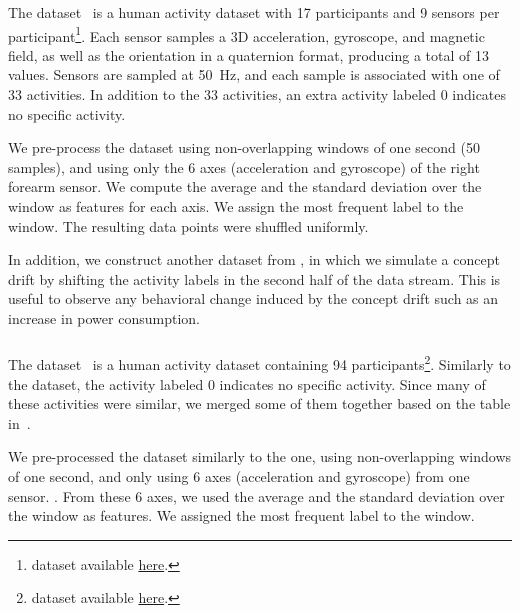\subsubsection{\banosdataset}
The \banosdataset dataset~\cite{Banos_2014} is a
human activity dataset with 17 participants
and 9 sensors per
participant\footnote{\banosdataset dataset
available
\href{https://archive.ics.uci.edu/ml/datasets/REALDISP+Activity+Recognition+Dataset\#:\~:text=The\%20REALDISP\%20(REAListic\%20sensor\%20DISPlacement,\%2Dplacement\%20and\%20induced\%2Ddisplacement.}{here}.}. Each sensor samples a 3D
acceleration, gyroscope, and magnetic field, as
well as the orientation in a quaternion format,
producing a total of 13 values.  Sensors are
sampled at 50~Hz, and each sample is associated
with one of 33 activities. In addition to the 33
activities, an extra activity labeled 0 indicates
no specific activity.

We pre-process the \banosdataset dataset using
non-overlapping windows of one second (50
samples), and using only the 6 axes (acceleration
and gyroscope)
of the right forearm sensor. We compute the average and the standard deviation over the
window as features for each axis. We assign the most
frequent label to the window.  The resulting data
points were shuffled uniformly.

In addition, we construct another dataset from \banosdataset, in which we
simulate a concept drift by shifting the activity labels in the
second half of the data stream. This is useful to
observe any behavioral change induced by the
concept drift such as an increase in power
consumption.

\subsubsection{\recofitdataset}
The \recofitdataset dataset~\cite{recofit} is a
human activity dataset containing 94
participants\footnote{\recofitdataset dataset
available
\href{https://msropendata.com/datasets/799c1167-2c8f-44c4-929c-227bf04e2b9a}{here}.}. Similarly to the \banosdataset
dataset, the activity labeled 0 indicates no
specific activity.
Since many of these activities were similar, we
merged  some of them together based on the table
in~\cite{behzad2019}. 

We pre-processed the dataset similarly to the
\banosdataset one, using non-overlapping windows of
one second, and only using 6 axes (acceleration
and gyroscope) from one sensor.
. From these 6 axes, we used the average and the standard deviation
over the window as features. We assigned the most
frequent label to the window.

